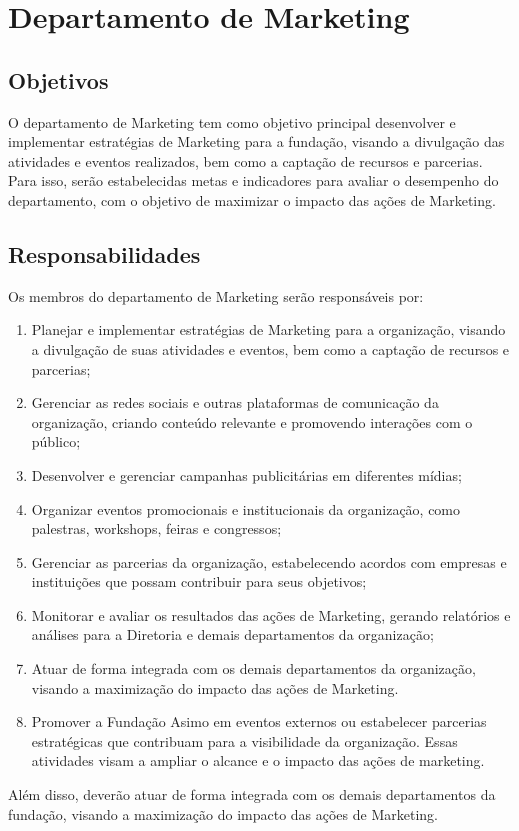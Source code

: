    \section{Departamento de Marketing}
        \subsection{Objetivos}
            O departamento de Marketing tem como objetivo principal desenvolver e implementar estratégias de Marketing para a fundação, visando a divulgação das atividades e eventos realizados, bem como a captação de recursos e parcerias. Para isso, serão estabelecidas metas e indicadores para avaliar o desempenho do departamento, com o objetivo de maximizar o impacto das ações de Marketing.
            
        \subsection{Responsabilidades}
            Os membros do departamento de Marketing serão responsáveis por:
            \begin{enumerate}
                \item  Planejar e implementar estratégias de Marketing para a organização, visando a divulgação de suas atividades e eventos, bem como a captação de recursos e parcerias;
                \item Gerenciar as redes sociais e outras plataformas de comunicação da organização, criando conteúdo relevante e promovendo interações com o público;
                \item Desenvolver e gerenciar campanhas publicitárias em diferentes mídias;
                \item Organizar eventos promocionais e institucionais da organização, como palestras, workshops, feiras e congressos;
                \item Gerenciar as parcerias da organização, estabelecendo acordos com empresas e instituições que possam contribuir para seus objetivos;
                \item Monitorar e avaliar os resultados das ações de Marketing, gerando relatórios e análises para a Diretoria e demais departamentos da organização;
                \item Atuar de forma integrada com os demais departamentos da organização, visando a maximização do impacto das ações de Marketing.
                \item Promover a Fundação Asimo em eventos externos ou estabelecer parcerias estratégicas que contribuam para a visibilidade da organização. Essas atividades visam a ampliar o alcance e o impacto das ações de marketing.
            \end{enumerate}
             Além disso, deverão atuar de forma integrada com os demais departamentos da fundação, visando a maximização do impacto das ações de Marketing.
             
